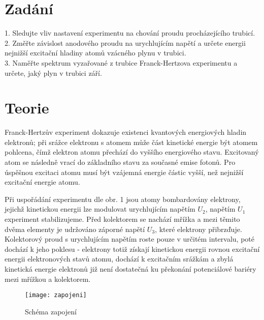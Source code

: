 \documentclass[czech,11pt,a4paper]{article}
\begin{document}
	\begin{multicols}{2}
		\section{Zadání}
	
	1. Sledujte vliv nastavení experimentu na chování proudu procházejícího trubicí.\\
	2. Změřte závislost anodového proudu na urychlujícím napětí a určete energii nejnižší excitační hladiny atomů vzácného plynu v trubici.\\
	3. Naměřte spektrum vyzařované z trubice Franck-Hertzova experimentu a určete, jaký plyn v trubici září.

		\section{Teorie}
		Franck-Hertzův experiment dokazuje existenci kvantových energiových hladin elektronů; při srážce elektronu s atomem může část kinetické energie být atomem pohlcena, čímž elektron atomu přechází do vyššího energiového stavu. Excitovaný atom se následně vrací do základního stavu za současné emise fotonů. Pro úspěšnou excitaci atomu musí být vzájemná energie částic vyšší, než nejnižší excitační energie atomu.
		
		
		Při uspořádání experimentu dle obr. 1 jsou atomy bombardovány elektrony, jejichž kinetickou energii lze modulovat urychlujícím napětím $U_2$, napětím $U_1$ experiment stabilizujeme. Před kolektorem se nachází mřížka a mezi těmito dvěma elementy je udržováno záporné napětí $U_3$, které elektrony přibrzďuje. Kolektorový proud s urychlujícím napětím roste pouze v určitém intervalu, poté dochází k jeho poklesu - elektrony totiž získají kinetickou energii rovnou excitační energii elektronových stavů atomu, dochází k excitačním srážkám a zbylá kinetická energie elektronů již není dostatečná ku překonání potenciálové bariéry mezi mřížkou a kolektorem.
		
		\begin{figure}[H]
			\centering
			\texttt{[image: zapojeni]}
			\caption{Schéma zapojení}
			\label{fig:zapojeni}
		\end{figure}
		

\end{multicols}
\end{document}
